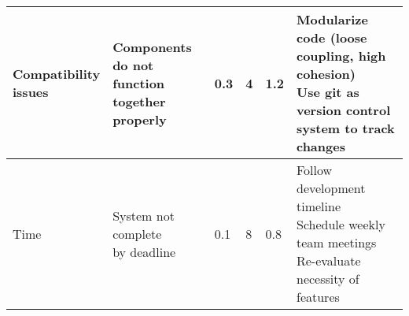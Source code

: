 \begin{table}[h!]
{\begin{tabular}{@{}llllll@{}}
    \midrule
    \makecell[l]{Compatibility \\
        issues } &
    \makecell[l]{Components do not \\ 
        function together properly } &
    0.3 &
    4 &
    1.2 &
    \makecell[l]{Modularize code (loose coupling, high cohesion) \\
        Use git as version control system to track changes} \\
    \midrule
    Time & 
    \makecell[l]{System not complete \\
        by deadline } & 
    0.1 &
    8 &
    0.8 &
    \makecell[l]{Follow development timeline \\ 
        Schedule weekly team meetings \\ 
        Re-evaluate necessity of features} \\
    \bottomrule
\end{tabular}%
}
\end{table}